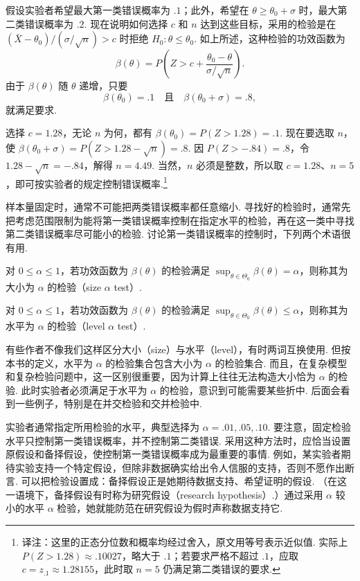 \begin{example}[续\autoref{ex:8.3.3}]\label{ex:8.3.4}
假设实验者希望最大第一类错误概率为 $.1$；此外，希望在 $\theta\ge\theta_0+\sigma$ 时，最大第二类错误概率为 $.2$. 现在说明如何选择 $c$ 和 $n$ 达到这些目标，采用的检验是在 $(\bar X-\theta_0)/(\sigma/\sqrt n)>c$ 时拒绝 $H_0:\theta\le\theta_0$. 如上所述，这种检验的功效函数为
$$\beta(\theta)=P\left(Z>c+\frac{\theta_0-\theta}{\sigma/\sqrt n}\right).$$
由于 $\beta(\theta)$ 随 $\theta$ 递增，只要
$$\beta(\theta_0)=.1\quad\text{且}\quad\beta(\theta_0+\sigma)=.8,$$
就满足要求.

选择 $c=1.28$，无论 $n$ 为何，都有 $\beta(\theta_0)=P(Z>1.28)=.1$. 现在要选取 $n$，使 $\beta(\theta_0+\sigma)=P(Z>1.28-\sqrt n)=.8$. 因 $P(Z>-.84)=.8$，令 $1.28-\sqrt n=-.84$，解得 $n=4.49$. 当然，$n$ 必须是整数，所以取 $c=1.28$、$n=5$，即可按实验者的规定控制错误概率.\footnote{译注：这里的正态分位数和概率均经过舍入，原文用等号表示近似值. 实际上 $P(Z>1.28)\approx.10027$，略大于 $.1$；若要求严格不超过 $.1$，应取 $c=z_{.1}\approx1.28155$，此时取 $n=5$ 仍满足第二类错误的要求.}
\end{example}
样本量固定时，通常不可能把两类错误概率都任意缩小. 寻找好的检验时，通常先把考虑范围限制为能将第一类错误概率控制在指定水平的检验，再在这一类中寻找第二类错误概率尽可能小的检验. 讨论第一类错误概率的控制时，下列两个术语很有用.
\begin{definition}\label{def:8.3.5}
对 $0\le\alpha\le1$，若功效函数为 $\beta(\theta)$ 的检验满足 $\sup_{\theta\in\Theta_0}\beta(\theta)=\alpha$，则称其为大小为 $\alpha$ 的检验（size $\alpha$ test\mbox{）.}
\end{definition}
\begin{definition}\label{def:8.3.6}
对 $0\le\alpha\le1$，若功效函数为 $\beta(\theta)$ 的检验满足 $\sup_{\theta\in\Theta_0}\beta(\theta)\le\alpha$，则称其为水平为 $\alpha$ 的检验（level $\alpha$ test\mbox{）.}
\end{definition}
有些作者不像我们这样区分大小（size）与水平（level），有时两词互换使用. 但按本书的定义，水平为 $\alpha$ 的检验集合包含大小为 $\alpha$ 的检验集合. 而且，在复杂模型和复杂检验问题中，这一区别很重要，因为计算上往往无法构造大小恰为 $\alpha$ 的检验. 此时实验者必须满足于水平为 $\alpha$ 的检验，意识到可能需要某些折中.
后面会看到一些例子，特别是在并交检验和交并检验中.

实验者通常指定所用检验的水平，典型选择为 $\alpha=.01,.05,.10$. 要注意，固定检验水平只控制第一类错误概率，并不控制第二类错误. 采用这种方法时，应恰当设置原假设和备择假设，使控制第一类错误概率成为最重要的事情. 例如，某实验者期待实验支持一个特定假设，但除非数据确实给出令人信服的支持，否则不愿作出断言. 可以把检验设置成：备择假设正是她期待数据支持、希望证明的假设. （在这一语境下，备择假设有时称为研究假设（research hypothesis\mbox{）.}）通过采用 $\alpha$ 较小的水平 $\alpha$ 检验，她就能防范在研究假设为假时声称数据支持它.

